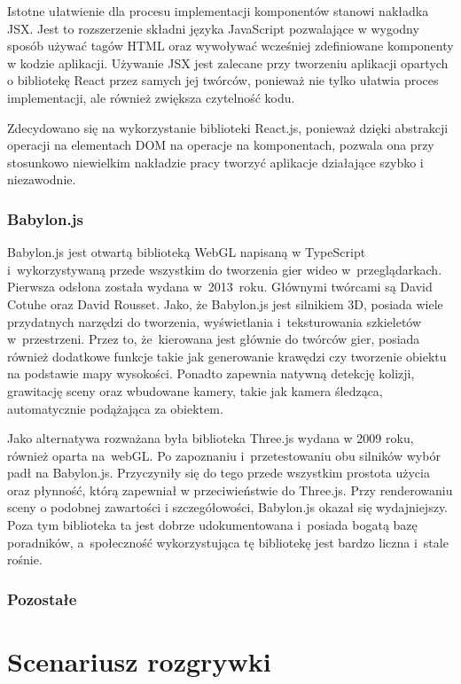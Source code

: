 \documentclass[12pt,a4paper,polish,thesis]{dcsbook}
\begin{document}
{   Istotne ułatwienie dla procesu implementacji komponentów stanowi nakładka JSX. Jest to rozszerzenie składni języka JavaScript pozwalające w wygodny sposób używać tagów HTML oraz wywoływać wcześniej zdefiniowane komponenty w kodzie aplikacji. Używanie JSX jest zalecane przy tworzeniu aplikacji opartych o bibliotekę React przez samych jej twórców, ponieważ nie tylko ułatwia proces implementacji, ale również zwiększa czytelność kodu.

   Zdecydowano się na wykorzystanie biblioteki React.js, ponieważ dzięki abstrakcji operacji na elementach DOM na operacje na komponentach, pozwala ona przy stosunkowo niewielkim nakładzie pracy tworzyć aplikacje działające szybko i niezawodnie.

	\subsubsection{Babylon.js}

	Babylon.js jest otwartą biblioteką WebGL napisaną w TypeScript i~wykorzystywaną przede wszystkim do tworzenia gier wideo w~przeglądarkach. Pierwsza odsłona została wydana w~2013~roku. Głównymi twórcami są David Cotuhe oraz David Rousset. Jako, że Babylon.js jest silnikiem 3D, posiada wiele przydatnych narzędzi do tworzenia, wyświetlania i~teksturowania szkieletów w~przestrzeni. Przez to, że~kierowana jest głównie do twórców gier, posiada również dodatkowe funkcje takie jak generowanie krawędzi czy tworzenie obiektu na podstawie mapy wysokości. Ponadto zapewnia natywną detekcję kolizji, grawitację sceny oraz wbudowane kamery, takie jak kamera śledząca, automatycznie podążająca za obiektem.

	Jako alternatywa rozważana była biblioteka Three.js wydana w 2009 roku, również oparta na~webGL. Po zapoznaniu i~przetestowaniu obu silników wybór padł na Babylon.js. Przyczyniły się do tego przede wszystkim prostota użycia oraz płynność, którą zapewniał w przeciwieństwie do Three.js. Przy renderowaniu sceny o podobnej zawartości i szczegółowości, Babylon.js okazał się wydajniejszy. Poza tym biblioteka ta jest dobrze udokumentowana i~posiada bogatą bazę poradników, a~społeczność wykorzystująca tę bibliotekę jest bardzo liczna i~stale rośnie.

	\subsubsection{Pozostałe}

	\section{Scenariusz rozgrywki}

}
\end{document}
